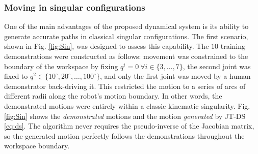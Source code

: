 \documentclass[letterpaper, 10 pt, conference,fleqn]{ieeeconf}
\begin{document}
\subsubsection{Moving in singular configurations}
One of the main advantages of the proposed dynamical system is its ability to generate accurate paths in classical singular configurations. The first scenario, shown in Fig. \ref{fig:Sin}, was designed to assess this capability. The $10$ training demonstrations were constructed as follows: movement was constrained to the boundary of the workspace by fixing $ q^i=0~\forall i\in\{3,\dots,7\}$, the second joint was fixed to $q^2\in\{10^\circ,20^\circ,\dots,100^\circ\}$, and only the first joint was moved by a human demonstrator back-driving it. This restricted the motion to a series of arcs of different radii along the robot's motion boundary. In other words, the demonstrated motions were entirely within a classic kinematic singularity. Fig. \ref{fig:Sin} shows the \textit{demonstrated} motions and the motion  \textit{generated} by JT-DS \eqref{eq:ds}. The algorithm never requires the pseudo-inverse of the Jacobian matrix, so the generated motion perfectly follows the demonstrations throughout the workspace boundary.
\end{document}
